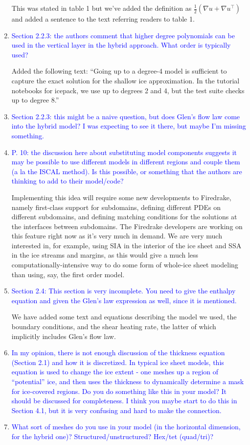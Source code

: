 \documentclass{article}
\theoremstyle{definition}
\theoremstyle{plain}
\begin{document}
\begin{enumerate}
This was stated in table 1 but we've added the definition as $\frac{1}{2}(\nabla u + \nabla u^\top)$ and added a sentence to the text referring readers to table 1.
\item \textcolor{blue}{Section 2.2.3: the authors comment that higher degree polynomials can be used in the vertical layer
in the hybrid approach. What order is typically used?}

Added the following text: ``Going up to a degree-4 model is sufficient to capture the exact solution for the shallow ice approximation.
In the tutorial notebooks for icepack, we use up to degrees 2 and 4, but the test suite checks up to degree 8.''
\item \textcolor{blue}{Section 2.2.3: this might be a naive question, but does Glen's flow law come into the hybrid model?
I was expecting to see it there, but maybe I'm missing something.}
\item \textcolor{blue}{P. 10: the discussion here about substituting model components suggests it may be possible to use
different models in different regions and couple them (a la the ISCAL method). Is this possible, or
something that the authors are thinking to add to their model/code?}

Implementing this idea will require some new developments to Firedrake, namely first-class support for subdomains, defining different PDEs on different subdomains, and defining matching conditions for the solutions at the interfaces between subdomains.
The Firedrake developers are working on this feature right now as it's very much in demand.
We are very much interested in, for example, using SIA in the interior of the ice sheet and SSA in the ice streams and margins, as this would give a much less computationally-intensive way to do some form of whole-ice sheet modeling than using, say, the first order model.
\item \textcolor{blue}{Section 2.4: This section is very incomplete. You need to give the enthalpy equation and given the
Glen's law expression as well, since it is mentioned.}

We have added some text and equations describing the model we used, the boundary conditions, and the shear heating rate, the latter of which implicitly includes Glen's flow law.
\item \textcolor{blue}{In my opinion, there is not enough discussion of the thickness equation (Section 2.1) and how it
is discretized. In typical ice sheet models, this equation is used to change the ice extent - one
meshes up a region of ``potential'' ice, and then uses the thickness to dynamically determine a mask
for ice-covered regions. Do you do something like this in your model? It should be discussed for
completeness. I think you maybe start to do this in Section 4.1, but it is very confusing and hard to
make the connection.}
\item \textcolor{blue}{What sort of meshes do you use in your model (in the horizontal dimension, for the hybrid one)?
Structured/unstructured? Hex/tet (quad/tri)?}


\end{enumerate}
\end{document}
